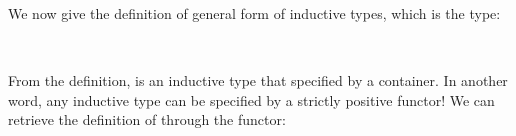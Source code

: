 We now give the definition of general form of inductive types, which is the  type:

\begin{code}%
\>[0]\AgdaSpace{}%
\AgdaSpace{}%
\AgdaSymbol{(}\AgdaSpace{}%
\AgdaSymbol{:}\AgdaSpace{}%
\AgdaSymbol{)}\AgdaSpace{}%
\AgdaSymbol{:}\AgdaSpace{}%
\AgdaSpace{}%
\<%
\\
\>[0][@{}l@{\AgdaIndent{0}}]%
\>[2]\AgdaSpace{}%
\AgdaSymbol{:}\AgdaSpace{}%
\AgdaSpace{}%
\AgdaSpace{}%
\AgdaSpace{}%
\AgdaSymbol{(}\AgdaSpace{}%
\AgdaSymbol{)}\AgdaSpace{}%
\AgdaSpace{}%
\AgdaSpace{}%
\<%
\end{code}

From the definition,  is an inductive type that specified by a container. In another word, any inductive type can be specified by a strictly positive functor! We can retrieve the definition of  through the  functor:

\begin{code}%
\>[0]\AgdaSpace{}%
\AgdaSymbol{:}\AgdaSpace{}%
\<%
\\
\>[0]\AgdaSpace{}%
\AgdaSymbol{=}\AgdaSpace{}%
\AgdaSpace{}%
\AgdaSpace{}%
\<%
\\
\>[0][@{}l@{\AgdaIndent{0}}]%
\>[2]\<%
\\
%
\>[2]\AgdaSpace{}%
\AgdaSymbol{:}\AgdaSpace{}%
\<%
\\
%
\>[2]\AgdaSpace{}%
\AgdaSymbol{=}\AgdaSpace{}%
\AgdaSpace{}%
\AgdaSpace{}%
\<%
\\
%
\\[\AgdaEmptyExtraSkip]%
%
\>[2]\AgdaSpace{}%
\AgdaSymbol{:}\AgdaSpace{}%
\AgdaSpace{}%
\AgdaSpace{}%
\<%
\\
%
\>[2]\AgdaSpace{}%
\AgdaSymbol{(}\AgdaSpace{}%
\AgdaSymbol{)}\AgdaSpace{}%
\AgdaSymbol{=}\AgdaSpace{}%
\<%
\\
%
\>[2]\AgdaSpace{}%
\AgdaSymbol{(}\AgdaSpace{}%
\AgdaSymbol{)}\AgdaSpace{}%
\AgdaSymbol{=}\AgdaSpace{}%
\<%
\\
%
\\[\AgdaEmptyExtraSkip]%
\>[0]\AgdaSpace{}%
\AgdaSymbol{:}\AgdaSpace{}%
\<%
\\
\>[0]\AgdaSpace{}%
\AgdaSymbol{=}\AgdaSpace{}%
\AgdaSpace{}%
\<%
\end{code}

